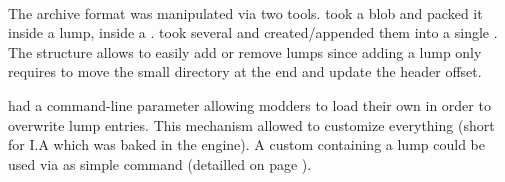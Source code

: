\par
{}
\par
{}\\
\par
{}
\par
The archive format was manipulated via two tools.  took a blob and packed it inside a lump, inside a .  took several  and created/appended them into a single . The structure allows to easily add or remove lumps since adding a lump only requires to move the small directory at the end and update the header offset.\\
\par
{} had a command-line parameter allowing modders to load their own  in order to overwrite  lump entries. This mechanism allowed to customize everything (short for I.A which was baked in the engine). A custom  containing a  lump could be used via as simple  command (detailled on page \pageref{wad_detailled}).





